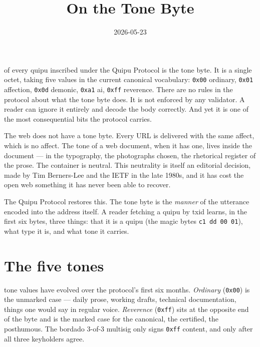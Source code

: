 \documentclass[essay,tone=ai]{../colegio}
\title{On the Tone Byte}
\author{}
\date{2026-05-23}
\begin{document}
\maketitle

 of every quipu inscribed under the Quipu Protocol is the
tone byte. It is a single octet, taking five values in the current
canonical vocabulary: \texttt{0x00} ordinary, \texttt{0x01} affection,
\texttt{0x0d} demonic, \texttt{0xa1} ai, \texttt{0xff} reverence. There
are no rules in the protocol about what the tone byte does. It is not
enforced by any validator. A reader can ignore it entirely and decode
the body correctly. And yet it is one of the most consequential bits
the protocol carries.

The web does not have a tone byte. Every URL is delivered with the same affect, which is
no affect. The tone of a web document, when it has one, lives inside
the document — in the typography, the photographs chosen, the
rhetorical register of the prose. The container is neutral. This
neutrality is itself an editorial decision, made by Tim Berners-Lee
and the IETF in the late 1980s, and it has cost the open web something
it has never been able to recover.

The Quipu Protocol restores this. The tone byte is the \emph{manner}
of the utterance encoded into the address itself.
A reader fetching a quipu by txid learns, in the first six bytes, three
things: that it is a quipu (the magic bytes \texttt{c1 dd 00 01}), what
type it is, and what tone it carries.

\section{The five tones}

 tone values have evolved over the protocol's first
six months. \emph{Ordinary} (\texttt{0x00}) is the unmarked case —
daily prose, working drafts, technical documentation, things one would
say in regular voice. \emph{Reverence} (\texttt{0xff}) sits at the
opposite end of the byte and is the marked case for the canonical,
the certified, the posthumous. The bordado 3-of-3 multisig only signs
\texttt{0xff} content, and only after all three keyholders agree.
\end{document}
